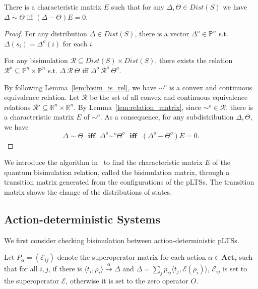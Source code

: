 \documentclass[runningheads]{llncs}
\newcommand{\pair}[1]{\langle{#1}\rangle}
\begin{document}
\begin{lemma}\label{lem:matrix_bisim}
There is a characteristic matrix $E$ such that for any $\Delta,\Theta\in Dist(S)$ we have $\Delta\sim\Theta$ iff $(\Delta-\Theta)E=0$.
\begin{proof}
For any distribution $\Delta\in Dist(S)$, there is a vector $\Delta^{o}\in \mathbb{P}^{n}$ s.t. $\Delta(s_{i})=\Delta^{o}(i)$ for each $i$.

For any bisimulation $\mathcal{R}\subseteq Dist(S)\times Dist(S)$, there exists the relation $\mathcal{R}^{o}\subseteq\mathbb{P}^{n}\times\mathbb{P}^{n}$ s.t. $\Delta~\mathcal{R}~\Theta$ iff $\Delta^{o}~\mathcal{R}^{o}~\Theta^{o}$. 

By following Lemma~\ref{lem:bisim_is_rel}, we have $\sim^{o}$ is a convex and continuous equivalence relation. Let $\mathscr{R}$ be the set of all convex and continuous equivalence relations $\mathcal{R'}\subseteq\mathbb{R}^{n}\times\mathbb{R}^{n}$. By Lemma~\ref{lem:relation_matrix}, since $\sim^{o}\in \mathscr{R}$, there is a characteristic matrix $E$ of $\sim^{o}$. As a consequence, for any subdistribution $\Delta,\Theta$, we have
\[\Delta\sim\Theta~~~\textbf{iff}~~~\Delta^{o}\sim^{o}\Theta^{o}~~~\textbf{iff}~~~(\Delta^{o}-\Theta^{o})E=0.\]
\end{proof}
\end{lemma}

We introduce the algorithm in~\cite{HKK14} to find the characteristic matrix $E$ of the quantum bisimulation relation, called the bisimulation matrix, through a transition matrix generated from the configurations of the pLTSs. The transition matrix shows the change of the distributions of states.


\subsection{Action-deterministic Systems}
We first consider checking bisimulation between action-deterministic pLTSs.

Let $P_{\alpha}=(\mathcal{E}_{ij})$ denote the superoperator matrix for each action $\alpha\in\textbf{Act}_{\tau}$ such that for all $i,j$, if there is $\pair{t_{i}, \rho_i}\xrightarrow{\alpha}\Delta$ and $\Delta=\sum_{j}p_{ij}\pair{t_{j}, \mathcal{E}(\rho_{i})}$, $\mathcal{E}_{ij}$ is set to the superoperator $\mathcal{E}$, otherwise it is set to the zero operator $O$.
\end{document}
